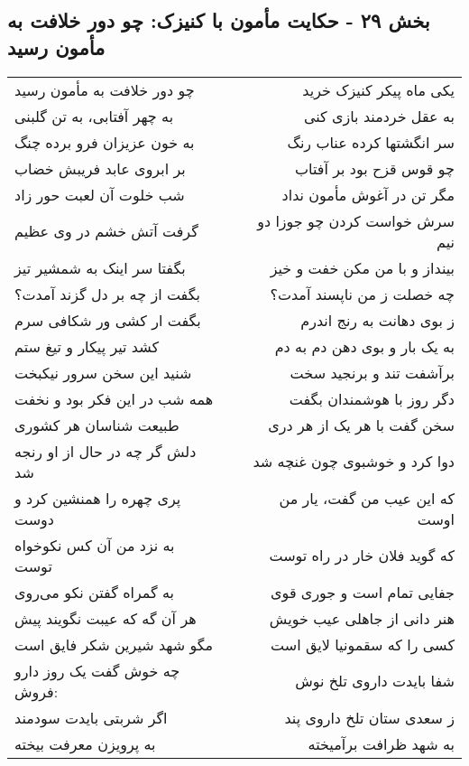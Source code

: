 \begin{center}
\section*{بخش ۲۹ - حکایت مأمون با کنیزک: چو دور خلافت به مأمون رسید}
\label{sec:029}
\begin{longtable}{l p{0.5cm} r}
چو دور خلافت به مأمون رسید
&&
یکی ماه پیکر کنیزک خرید
\\
به چهر آفتابی، به تن گلبنی
&&
به عقل خردمند بازی کنی
\\
به خون عزیزان فرو برده چنگ
&&
سر انگشتها کرده عناب رنگ
\\
بر ابروی عابد فریبش خضاب
&&
چو قوس قزح بود بر آفتاب
\\
شب خلوت آن لعبت حور زاد
&&
مگر تن در آغوش مأمون نداد
\\
گرفت آتش خشم در وی عظیم
&&
سرش خواست کردن چو جوزا دو نیم
\\
بگفتا سر اینک به شمشیر تیز
&&
بینداز و با من مکن خفت و خیز
\\
بگفت از چه بر دل گزند آمدت؟
&&
چه خصلت ز من ناپسند آمدت؟
\\
بگفت ار کشی ور شکافی سرم
&&
ز بوی دهانت به رنج اندرم
\\
کشد تیر پیکار و تیغ ستم
&&
به یک بار و بوی دهن دم به دم
\\
شنید این سخن سرور نیکبخت
&&
برآشفت تند و برنجید سخت
\\
همه شب در این فکر بود و نخفت
&&
دگر روز با هوشمندان بگفت
\\
طبیعت شناسان هر کشوری
&&
سخن گفت با هر یک از هر دری
\\
دلش گر چه در حال از او رنجه شد
&&
دوا کرد و خوشبوی چون غنچه شد
\\
پری چهره را همنشین کرد و دوست
&&
که این عیب من گفت، یار من اوست
\\
به نزد من آن کس نکوخواه توست
&&
که گوید فلان خار در راه توست
\\
به گمراه گفتن نکو می‌روی
&&
جفایی تمام است و جوری قوی
\\
هر آن گه که عیبت نگویند پیش
&&
هنر دانی از جاهلی عیب خویش
\\
مگو شهد شیرین شکر فایق است
&&
کسی را که سقمونیا لایق است
\\
چه خوش گفت یک روز دارو فروش:
&&
شفا بایدت داروی تلخ نوش
\\
اگر شربتی بایدت سودمند
&&
ز سعدی ستان تلخ داروی پند
\\
به پرویزن معرفت بیخته
&&
به شهد ظرافت برآمیخته
\\
\end{longtable}
\end{center}
